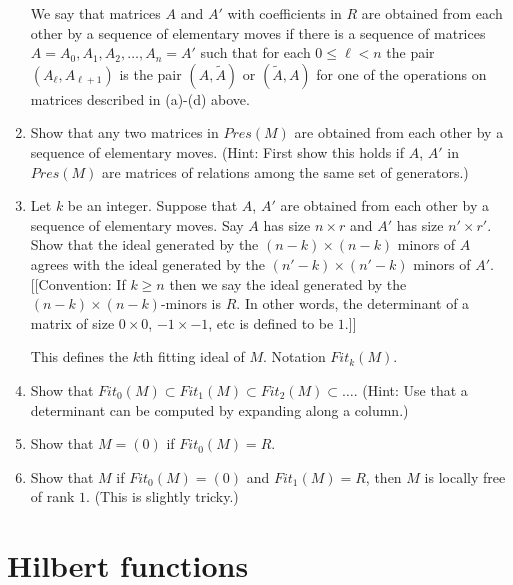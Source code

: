 \begin{exercise}
\begin{enumerate}
\smallskip\noindent
We say that matrices $A$ and $A'$ with coefficients in $R$
are obtained from each other by a sequence of elementary moves if
there is a sequence of matrices $A=A_0, A_1, A_2,\ldots, A_n=A'$ such
that for each $0\leq \ell < n$ the pair $(A_\ell, A_{\ell+1})$ is the
pair $(A,\tilde A)$ or $(\tilde A, A)$ for one of the operations on
matrices described in (a)-(d) above.

\item Show that any two matrices in $Pres(M)$ are obtained from
each other by a sequence of elementary moves. (Hint: First show this 
holds if $A$, $A'$ in $Pres(M)$ are matrices of relations among the same
set of generators.)
\item Let $k$ be an integer. Suppose that $A$, $A'$ are obtained from
each other by a sequence of elementary moves. Say $A$ has size $n \times r$
and $A'$ has size $n' \times r'$. Show that the ideal generated by the 
$(n-k)\times (n-k)$ minors of $A$ agrees with the ideal generated by the
$(n'-k)\times (n'-k)$ minors of $A'$. [[Convention: If $k\geq n$ then we say
the ideal generated by the $(n-k)\times (n-k)$-minors is $R$. In other words,
the determinant of a matrix of size $0 \times 0$, $-1 \times -1$, etc
is defined to be $1$.]]

\smallskip\noindent
This defines the $k$th fitting ideal of $M$. Notation $Fit_k(M)$.

\item Show that
$Fit_0(M) \subset Fit_1(M) \subset Fit_2(M) \subset \ldots$.
(Hint: Use that a determinant can be computed by expanding along a column.)
\item Show that $M=(0)$ if $Fit_0(M)=R$.
\item Show that $M$ if $Fit_0(M)=(0)$ and $Fit_1(M)=R$, then $M$ is
locally free of rank $1$. (This is slightly tricky.)
\end{enumerate}
\end{exercise}




\section{Hilbert functions}
\label{section-hilbert}

